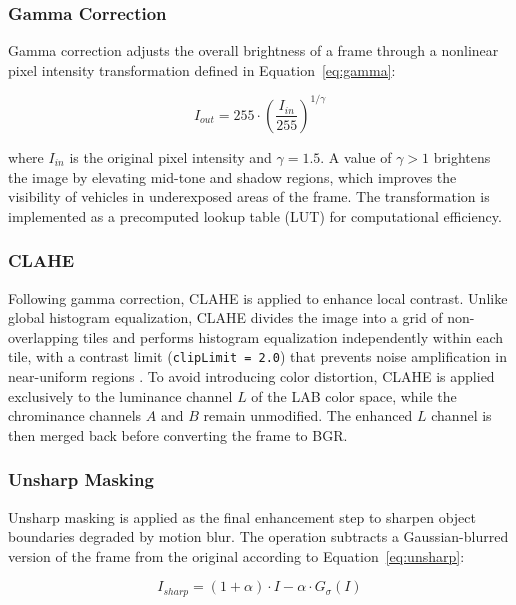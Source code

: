 \subsubsection{Gamma Correction}
Gamma correction adjusts the overall brightness of a frame through a nonlinear pixel intensity transformation defined in Equation~\ref{eq:gamma}:

\begin{equation}
I_{out} = 255 \cdot \left(\frac{I_{in}}{255}\right)^{1/\gamma}
\label{eq:gamma}
\end{equation}

\noindent where $I_{in}$ is the original pixel intensity and $\gamma = 1.5$. A value of $\gamma > 1$ brightens the image by elevating mid-tone and shadow regions, which improves the visibility of vehicles in underexposed areas of the frame. The transformation is implemented as a precomputed lookup table (LUT) for computational efficiency.

\figGammaCorrection

\subsubsection{CLAHE}
Following gamma correction, CLAHE is applied to enhance local contrast. Unlike global histogram equalization, CLAHE divides the image into a grid of non-overlapping tiles and performs histogram equalization independently within each tile, with a contrast limit (\texttt{clipLimit = 2.0}) that prevents noise amplification in near-uniform regions \cite{zuiderveld1994}. To avoid introducing color distortion, CLAHE is applied exclusively to the luminance channel $L$ of the LAB color space, while the chrominance channels $A$ and $B$ remain unmodified. The enhanced $L$ channel is then merged back before converting the frame to BGR.

\subsubsection{Unsharp Masking}
Unsharp masking is applied as the final enhancement step to sharpen object boundaries degraded by motion blur. The operation subtracts a Gaussian-blurred version of the frame from the original according to Equation~\ref{eq:unsharp}:

\figCLAHE

\begin{equation}
I_{sharp} = (1 + \alpha) \cdot I - \alpha \cdot G_\sigma(I)
\label{eq:unsharp}
\end{equation}

